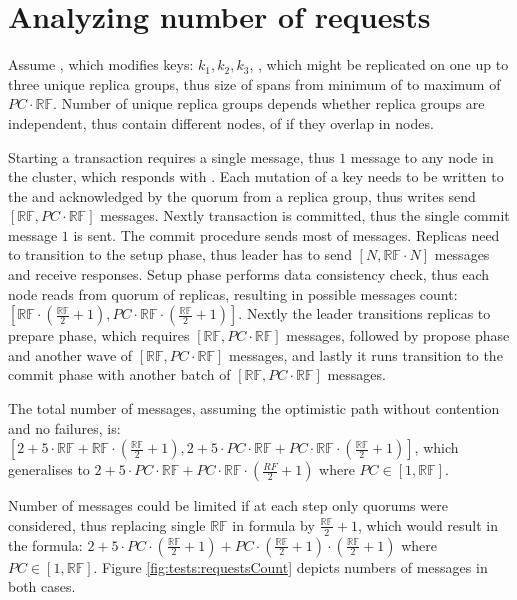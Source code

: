 \section{Analyzing number of requests}
Assume \transaction, which modifies keys: $k_{1}, k_{2}, k_{3}$,
, which might be replicated on one up to three unique replica groups, thus size of \nodesTx spans from minimum of \RFalone to maximum of $PC\cdot\mathbb{RF}$. Number of unique replica groups depends whether replica groups are independent, thus contain different nodes, of if they overlap in nodes.

Starting a transaction requires a single message, thus $1$ message to any node in the cluster, which responds with \txState.
Each mutation of a key needs to be written to the \txStorage and acknowledged by the quorum from a replica group, thus writes send $[\mathbb{RF},PC\cdot\mathbb{RF}]$ messages.
Nextly transaction is committed, thus the single commit message $1$ is sent.
The commit procedure sends most of messages.
Replicas need to transition to the setup phase, thus leader has to send $[N,\mathbb{RF}\cdot N]$ messages and receive responses.
Setup phase performs data consistency check, thus each node reads from quorum of replicas, resulting in possible messages count: $[\mathbb{RF} \cdot (\frac{\mathbb{RF}}{2} + 1),PC\cdot\mathbb{RF} \cdot (\frac{\mathbb{RF}}{2} + 1)]$.
Nextly the leader transitions replicas to prepare phase, which requires $[\mathbb{RF},PC\cdot\mathbb{RF}]$ messages, followed by propose phase and another wave of $[\mathbb{RF},PC\cdot\mathbb{RF}]$ messages, and lastly it runs transition to the commit phase with another batch of $[\mathbb{RF},PC\cdot\mathbb{RF}]$ messages.

The total number of messages, assuming the optimistic path without contention and no failures, 
is: $[2 + 5 \cdot \mathbb{RF} + \mathbb{RF} \cdot (\frac{\mathbb{RF}}{2} + 1), 2 + 5 \cdot PC\cdot\mathbb{RF} + PC \cdot \mathbb{RF} \cdot (\frac{\mathbb{RF}}{2} + 1)]$,
which generalises to $2 + 5 \cdot PC\cdot\mathbb{RF} + PC \cdot \mathbb{RF} \cdot (\frac{RF}{2} + 1)$ where $PC \in [1, \mathbb{RF}]$.

Number of messages could be limited if at each step only quorums were considered, thus replacing single $\mathbb{RF}$ in formula by $\frac{\mathbb{RF}}{2} + 1$, which would result in the formula: 
$2 + 5 \cdot PC \cdot (\frac{\mathbb{RF}}{2} + 1) + PC \cdot (\frac{\mathbb{RF}}{2} + 1) \cdot (\frac{\mathbb{RF}}{2} + 1)$ where $PC \in [1, \mathbb{RF}]$.
Figure \ref{fig:tests:requestsCount} depicts numbers of messages in both cases.



